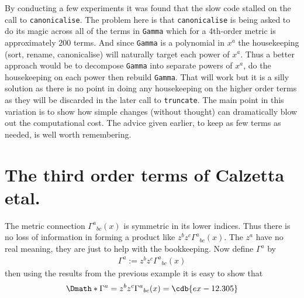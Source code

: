 \documentclass[a4paper,12pt]{article}
\numberwithin{equation}{section}%
\begin{document}
By conducting a few experiments it was found that the slow code stalled on the call to
\verb|canonicalise|. The problem here is that \verb|canonicalise| is being asked to do its
magic across all of the terms in \verb|Gamma| which for a 4th-order metric is approximately
200 terms. And since \verb|Gamma| is a polynomial in $x^{a}$ the housekeeping (sort, rename,
canonicalise) will naturally target each power of $x^{a}$. Thus a better approach would be
to decompose \verb|Gamma| into separate powers of $x^{a}$, do the housekeeping on each power
then rebuild \verb|Gamma|. That will work but it is a silly solution as there is no point in
doing any housekeeping on the higher order terms as they will be discarded in the later call
to \verb|truncate|. The main point in this variation is to show how simple changes (without
thought) can dramatically blow out the computational cost. The advice given earlier, to keep
as few terms as needed, is well worth remembering.

\clearpage

\section{The third order terms of Calzetta etal.}
\label{sec:ex-12}
\setcounter{ExerciseNum}{0}



The metric connection $\Gamma^{a}{}_{bc}(x)$ is symmetric in its lower indices. Thus there is
no loss of information in forming a product like $z^{b} z^{c} \Gamma^{a}{}_{bc}(x)$. The
$z^{a}$ have no real meaning, they are just to help with the bookkeeping. Now define
$\Gamma^{a}$ by \begin{align*}
   \Gamma^{a} := z^{b} z^{c} \Gamma^{a}{}_{bc}(x)
\end{align*}
then using the results from the previous example it is easy to show that
\begin{dgroup*}[spread=5pt]
   \Dmath*{ \Gamma^{a} = z^{b} z^{c} \Gamma^{a}{}_{bc}(x) = \cdb{ex-12.305} }
\end{dgroup*}
\end{document}
